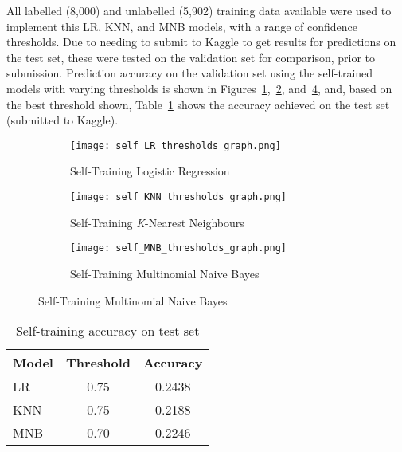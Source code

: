 \documentclass[11pt]{article}
\begin{document}
All labelled (8,000) and unlabelled (5,902) training data 
available were used to implement this LR, KNN, and MNB models, with a 
range of confidence thresholds. Due to needing to submit to Kaggle to get 
results for predictions on the test set, these were tested on the validation set for comparison, prior to submission. 
Prediction accuracy on the validation set using the self-trained models with 
varying thresholds is shown in Figures~\ref{fig:self LR},~\ref{fig:self KNN}, and~\ref{fig:self MNB}, 
and, based on the best threshold shown, Table~\ref{table:self test} shows the accuracy achieved on the test set (submitted to Kaggle).

\begin{figure}[h]
\caption{Self-Training Models}
\begin{subfigure}{0.5\textwidth}
	\texttt{[image: self\_LR\_thresholds\_graph.png]}
	\caption{Self-Training Logistic Regression}
	\label{fig:self LR}
	\centering
\end{subfigure}	
\begin{subfigure}{0.5\textwidth}
	\texttt{[image: self\_KNN\_thresholds\_graph.png]}
	\caption{Self-Training \textit{K}-Nearest Neighbours}
	\label{fig:self KNN}
	\centering
\end{subfigure}
\begin{subfigure}{0.5\textwidth}
	\texttt{[image: self\_MNB\_thresholds\_graph.png]}
	\caption{Self-Training Multinomial Naive Bayes}
	\label{fig:self MNB}
	\centering
\end{subfigure}

\end{figure}

\begin{table}[h]
 \begin{center}
\begin{tabular}{|l||c|c|}

      \hline
      \textbf{Model} & \textbf{Threshold} & \textbf{Accuracy}\\
      \hline\hline
      LR & 0.75 & 0.2438\\
	\hline
      KNN & 0.75 & 0.2188\\
	\hline
      MNB & 0.70 & 0.2246\\
      \hline

\end{tabular}
\caption{Self-training accuracy on test set}
\label{table:self test}
\end{center}
\end{table}
\end{document}
